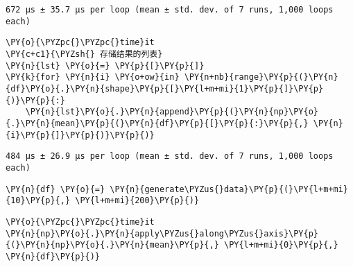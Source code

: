     \begin{Verbatim}[commandchars=\\\{\}]
672 µs ± 35.7 µs per loop (mean ± std. dev. of 7 runs, 1,000 loops each)
    \end{Verbatim}

    \begin{tcolorbox}[breakable, size=fbox, boxrule=1pt, pad at break*=1mm,colback=cellbackground, colframe=cellborder]
\begin{Verbatim}[commandchars=\\\{\}]
\PY{o}{\PYZpc{}\PYZpc{}time}it
\PY{c+c1}{\PYZsh{} 存储结果的列表}
\PY{n}{lst} \PY{o}{=} \PY{p}{[}\PY{p}{]}
\PY{k}{for} \PY{n}{i} \PY{o+ow}{in} \PY{n+nb}{range}\PY{p}{(}\PY{n}{df}\PY{o}{.}\PY{n}{shape}\PY{p}{[}\PY{l+m+mi}{1}\PY{p}{]}\PY{p}{)}\PY{p}{:}
    \PY{n}{lst}\PY{o}{.}\PY{n}{append}\PY{p}{(}\PY{n}{np}\PY{o}{.}\PY{n}{mean}\PY{p}{(}\PY{n}{df}\PY{p}{[}\PY{p}{:}\PY{p}{,} \PY{n}{i}\PY{p}{]}\PY{p}{)}\PY{p}{)}
\end{Verbatim}
\end{tcolorbox}

    \begin{Verbatim}[commandchars=\\\{\}]
484 µs ± 26.9 µs per loop (mean ± std. dev. of 7 runs, 1,000 loops each)
    \end{Verbatim}

    \begin{tcolorbox}[breakable, size=fbox, boxrule=1pt, pad at break*=1mm,colback=cellbackground, colframe=cellborder]
\begin{Verbatim}[commandchars=\\\{\}]
\PY{n}{df} \PY{o}{=} \PY{n}{generate\PYZus{}data}\PY{p}{(}\PY{l+m+mi}{10}\PY{p}{,} \PY{l+m+mi}{200}\PY{p}{)}
\end{Verbatim}
\end{tcolorbox}

    \begin{tcolorbox}[breakable, size=fbox, boxrule=1pt, pad at break*=1mm,colback=cellbackground, colframe=cellborder]
\begin{Verbatim}[commandchars=\\\{\}]
\PY{o}{\PYZpc{}\PYZpc{}time}it
\PY{n}{np}\PY{o}{.}\PY{n}{apply\PYZus{}along\PYZus{}axis}\PY{p}{(}\PY{n}{np}\PY{o}{.}\PY{n}{mean}\PY{p}{,} \PY{l+m+mi}{0}\PY{p}{,} \PY{n}{df}\PY{p}{)}
\end{Verbatim}
\end{tcolorbox}

